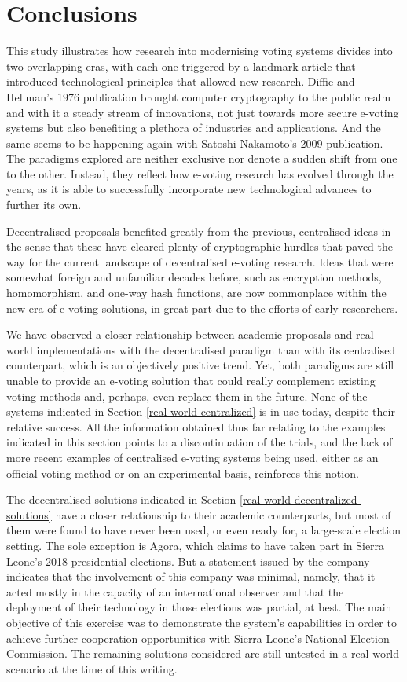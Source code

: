 \documentclass{ieeeaccess}
\begin{document}
\section{Conclusions}
This study illustrates how research into modernising voting systems divides into two overlapping eras, with each one triggered by a landmark article that introduced technological principles that allowed new research. Diffie and Hellman's \cite{Diffie1976} 1976 publication brought computer cryptography to the public realm and with it a steady stream of innovations, not just towards more secure e-voting systems but also benefiting a plethora of industries and applications. And the same seems to be happening again with Satoshi Nakamoto's \cite{Nakamoto2008} 2009 publication. The paradigms explored are neither exclusive nor denote a sudden shift from one to the other. Instead, they reflect how e-voting research has evolved through the years, as it is able to successfully incorporate new technological advances to further its own.
\par
Decentralised proposals benefited greatly from the previous, centralised ideas in the sense that these have cleared plenty of cryptographic hurdles that paved the way for the current landscape of decentralised e-voting research. Ideas that were somewhat foreign and unfamiliar decades before, such as encryption methods, homomorphism, and one-way hash functions, are now commonplace within the new era of e-voting solutions, in great part due to the efforts of early researchers.
\par
We have observed a closer relationship between academic proposals and real-world implementations with the decentralised paradigm than with its centralised counterpart, which is an objectively positive trend. Yet, both paradigms are still unable to provide an e-voting solution that could really complement existing voting methods and, perhaps, even replace them in the future. None of the systems indicated in Section \ref{real-world-centralized} is in use today, despite their relative success. All the information obtained thus far relating to the examples indicated in this section points to a discontinuation of the trials, and the lack of more recent examples of centralised e-voting systems being used, either as an official voting method or on an experimental basis, reinforces this notion.
\par
The decentralised solutions indicated in Section \ref{real-world-decentralized-solutions} have a closer relationship to their academic counterparts, but most of them were found to have never been used, or even ready for, a large-scale election setting. The sole exception is Agora, which claims to have taken part in Sierra Leone's 2018 presidential elections. But a statement issued by the company \cite{Agora2018} indicates that the involvement of this company was minimal, namely, that it acted mostly in the capacity of an international observer and that the deployment of their technology in those elections was partial, at best. The main objective of this exercise was to demonstrate the system's capabilities in order to achieve further cooperation opportunities with Sierra Leone's National Election Commission. The remaining solutions considered are still untested in a real-world scenario at the time of this writing.
\end{document}
